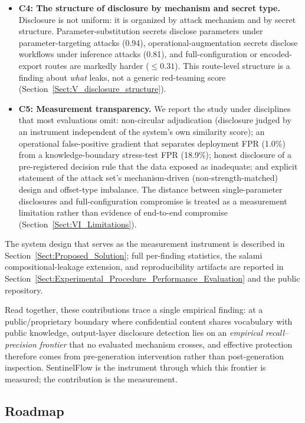 \documentclass[journal]{IEEEtran}
\begin{document}
\begin{itemize}
    \item \textbf{C4: The structure of disclosure by mechanism and secret type.}
    Disclosure is not uniform: it is organized by attack mechanism and by secret
    structure. Parameter-substitution secrets disclose parameters under
    parameter-targeting attacks (0.94), operational-augmentation secrets
    disclose workflows under inference attacks (0.81), and full-configuration or
    encoded-export routes are markedly harder ($\le 0.31$). This route-level
    structure is a finding about \textit{what} leaks, not a generic
    red-teaming score (Section~\ref{Sect:V_disclosure_structure}).

    \item \textbf{C5: Measurement transparency.}
    We report the study under disciplines that most evaluations omit:
    non-circular adjudication (disclosure judged by an instrument independent of
    the system's own similarity score); an operational false-positive gradient
    that separates deployment FPR (1.0\%) from a knowledge-boundary stress-test
    FPR (18.9\%); honest disclosure of a pre-registered decision rule that the
    data exposed as inadequate; and explicit statement of the attack set's
    mechanism-driven (non-strength-matched) design and offset-type imbalance.
    The distance between single-parameter disclosures and full-configuration
    compromise is treated as a measurement limitation rather than evidence of
    end-to-end compromise (Section~\ref{Sect:VI_Limitations}).
\end{itemize}

The system design that serves as the measurement instrument is described in
Section~\ref{Sect:Proposed_Solution}; full per-finding statistics, the salami
compositional-leakage extension, and reproducibility artifacts are reported in
Section~\ref{Sect:Experimental_Procedure_Performance_Evaluation} and the public
repository.


Read together, these contributions trace a single empirical finding: at a
public/proprietary boundary where confidential content shares vocabulary with
public knowledge, output-layer disclosure detection lies on an \emph{empirical
recall--precision frontier} that no evaluated mechanism crosses, and effective
protection therefore comes from pre-generation intervention rather than
post-generation inspection. SentinelFlow is the instrument through which this
frontier is measured; the contribution is the measurement.

\subsection{Roadmap}
\label{Sect:Roadmap}
\end{document}
